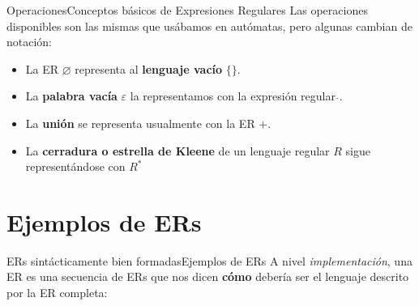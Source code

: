 \documentclass[spanish]{beamer}
\begin{document}
\begin{frame}{Operaciones}{Conceptos básicos de Expresiones Regulares}
    Las operaciones disponibles son las mismas que usábamos en autómatas, pero algunas cambian de notación: \pause

    \bigskip

    \begin{itemize}
        \item La ER $\varnothing$ representa al \textbf{lenguaje vacío} $\{\}$. \pause
        \item La \textbf{palabra vacía} $\varepsilon$ la representamos con la expresión regular $\hat{}$. \pause
        \item La \textbf{unión} se representa usualmente con la ER $+$. \pause
        \item La \textbf{cerradura o estrella de Kleene} de un lenguaje regular $R$ sigue representándose con $R^*$
    \end{itemize}
\end{frame}

\section{Ejemplos de ERs}
\label{sec:ex}

\begin{frame}{ERs sintácticamente bien formadas}{Ejemplos de ERs}
    A nivel \textit{implementación}, una ER es una secuencia de ERs que nos dicen \textbf{cómo} debería ser el lenguaje descrito por la ER completa: \pause

    \bigskip

    \onslide

    \pause


    \pause

    
    \pause

\end{frame}
\end{document}
